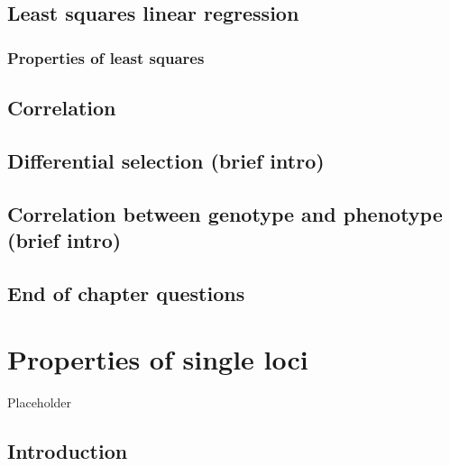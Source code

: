 \documentclass[
]{book}
\begin{document}
\hypertarget{least-squares-linear-regression}{%
\section{Least squares linear regression}\label{least-squares-linear-regression}}

\hypertarget{properties-of-least-squares}{%
\subsection{Properties of least squares}\label{properties-of-least-squares}}

\hypertarget{correlation}{%
\section{Correlation}\label{correlation}}

\hypertarget{differential-selection-brief-intro}{%
\section{Differential selection (brief intro)}\label{differential-selection-brief-intro}}

\hypertarget{correlation-between-genotype-and-phenotype-brief-intro}{%
\section{Correlation between genotype and phenotype (brief intro)}\label{correlation-between-genotype-and-phenotype-brief-intro}}

\hypertarget{end-of-chapter-questions}{%
\section{End of chapter questions}\label{end-of-chapter-questions}}

\hypertarget{properties-of-single-loci}{%
\chapter{Properties of single loci}\label{properties-of-single-loci}}

Placeholder

\hypertarget{introduction}{%
\section{Introduction}\label{introduction}}
\end{document}
